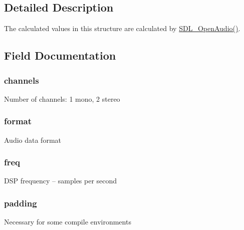 \subsection{Detailed Description}
The calculated values in this structure are calculated by \hyperlink{_s_d_l__audio_8h_a2edf30e7747584e28041b4986f89f440}{S\+D\+L\+\_\+\+Open\+Audio()}. 

\subsection{Field Documentation}
\subsubsection[{\texorpdfstring{channels}{channels}}]{ channels}\hypertarget{struct_s_d_l___audio_spec_a2a6435e054f3ee99cbef44344bf83289}{}\label{struct_s_d_l___audio_spec_a2a6435e054f3ee99cbef44344bf83289}
Number of channels\+: 1 mono, 2 stereo 
\subsubsection[{\texorpdfstring{format}{format}}]{ format}\hypertarget{struct_s_d_l___audio_spec_ab7e71a641a48b8199ef79f8c7f41af61}{}\label{struct_s_d_l___audio_spec_ab7e71a641a48b8199ef79f8c7f41af61}
Audio data format 
\subsubsection[{\texorpdfstring{freq}{freq}}]{ freq}\hypertarget{struct_s_d_l___audio_spec_ae0d22272b68e75d19ac0b80c01f806b6}{}\label{struct_s_d_l___audio_spec_ae0d22272b68e75d19ac0b80c01f806b6}
D\+SP frequency -- samples per second 
\subsubsection[{\texorpdfstring{padding}{padding}}]{ padding}\hypertarget{struct_s_d_l___audio_spec_a489489d55916facdcdfcc2f20fe18309}{}\label{struct_s_d_l___audio_spec_a489489d55916facdcdfcc2f20fe18309}
Necessary for some compile environments 
